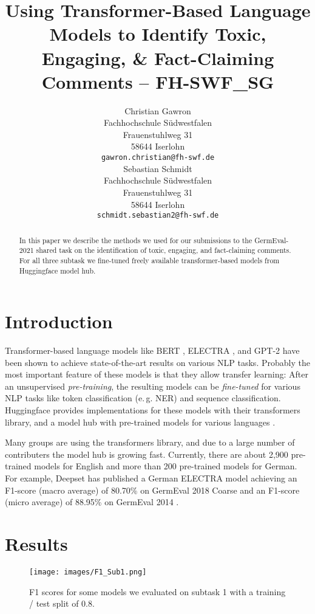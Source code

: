 \documentclass[11pt,a4paper]{article}
\title{Using Transformer-Based Language Models to Identify Toxic, Engaging, \& Fact-Claiming Comments -- FH-SWF\_SG}
\author{Christian Gawron \\
  Fachhochschule Südwestfalen \\
  Frauenstuhlweg 31 \\
  58644 Iserlohn \\
  \texttt{gawron.christian@fh-swf.de} \\\And
  Sebastian Schmidt \\
  Fachhochschule Südwestfalen \\
  Frauenstuhlweg 31 \\
  58644 Iserlohn \\
  \texttt{schmidt.sebastian2@fh-swf.de} \\}
\date{}
\begin{document}
\maketitle
\begin{abstract}
    In this paper we describe the methods we used for our submissions to the 
    GermEval-2021 shared task on the identification of toxic, engaging, and fact-claiming comments.
    For all three subtask we fine-tuned freely available transformer-based models from Huggingface model hub.
    
\end{abstract}



\section{Introduction}

Transformer-based language models like BERT \cite{BERT}, ELECTRA \cite{ELECTRA}, and GPT-2 \cite{GPT2} have been 
shown to achieve state-of-the-art results on various NLP tasks. 
Probably the most important feature of these models is that they allow transfer learning: After an unsupervised \emph{pre-training}, the resulting models can be 
\emph{fine-tuned} for various NLP tasks like token classification (e.\,g. NER) and sequence classification.
Huggingface provides implementations for these models with their transformers library, and a model hub with pre-trained models for various languages \cite{huggingface}. 

Many groups are using the transformers library, and due to a large number of contributers the model hub is growing fast. Currently, there are about 
2,900 pre-trained models for English and more than 200 pre-trained models for German.
For example, Deepset has published a German ELECTRA model achieving an F1-score (macro average) of 80.70\% on GermEval 2018 Coarse and 
an F1-score (micro average) of 88.95\% on GermEval 2014 \cite{GNLM}.



\section{Results}

\begin{figure}[h]
  \texttt{[image: images/F1\_Sub1.png]}
  \label{plot:F1_Sub1}
  \caption{F1 scores for some models we evaluated on subtask 1 with a training / test split of 0.8.}
\end{figure}
\end{document}
